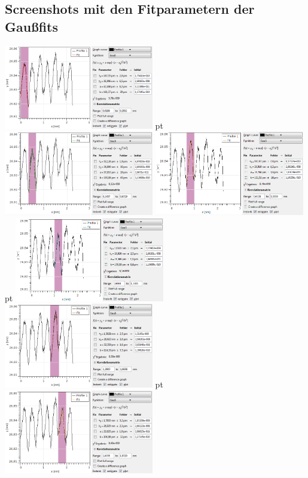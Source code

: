 \documentclass[12pt,listof=totoc]{scrartcl}
\begin{document}
\subsection{Screenshots mit den Fitparametern der Gaußfits}\label{screenshots}
\begin{minipage}[h!]{\textwidth}
	{\centering
	\includegraphics[width=0.49\textwidth]{figures/fitdata/Gaussfit-1-horizontal.png} pt
	\includegraphics[width=0.49\textwidth]{figures/fitdata/Gaussfit-2-horizontal.png}
	\includegraphics[width=0.49\textwidth]{figures/fitdata/Gaussfit-3-horizontal.png} pt
	\includegraphics[width=0.49\textwidth]{figures/fitdata/Gaussfit-4-horizontal.png}
	\includegraphics[width=0.49\textwidth]{figures/fitdata/Gaussfit-5-horizontal.png} pt	\includegraphics[width=0.49\textwidth]{figures/fitdata/Gaussfit-6-horizontal.png}}

\end{minipage}
\end{document}
